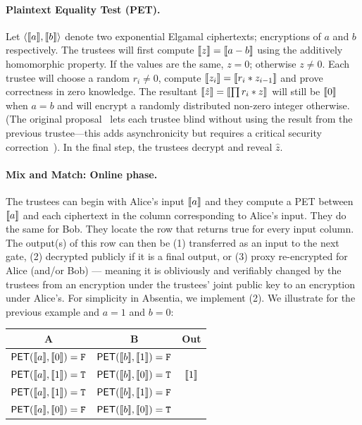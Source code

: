 \paragraph{Plaintext Equality Test (PET).} Let $\left \langle \llbracket a \rrbracket,\llbracket b \rrbracket \right \rangle$ denote two exponential Elgamal ciphertexts; encryptions of $a$ and $b$ respectively. The trustees will first compute $\llbracket z \rrbracket=\llbracket a-b \rrbracket$ using the additively homomorphic property. If the values are the same, $z=0$; otherwise $z\neq 0$. Each trustee will choose a random $r_i\neq0$, compute $\llbracket z_i \rrbracket=\llbracket r_i*z_{i-1} \rrbracket$ and prove correctness in zero knowledge. The resultant $\llbracket \hat{z} \rrbracket=\llbracket \prod r_i*z \rrbracket$ will still be $\llbracket 0 \rrbracket$ when $a=b$ and will encrypt a randomly distributed non-zero integer otherwise. (The original proposal~\cite{JJ00} lets each trustee blind without using the result from the previous trustee---this adds asynchronicity but requires a critical security correction~\cite{mcmurtry2020test}). In the final step, the trustees decrypt and reveal $\hat{z}$.

\paragraph{Mix and Match: Online phase.} The trustees can begin with Alice's input $\llbracket a \rrbracket$ and they compute a PET between $\llbracket a \rrbracket$ and each ciphertext in the column corresponding to Alice's input. They do the same for Bob. They locate the row that returns true for every input column. The output(s) of this row can then be (1) transferred as an input to the next gate, (2) decrypted publicly if it is a final output, or (3) proxy re-encrypted for Alice (and/or Bob) --- meaning it is obliviously and verifiably changed by the trustees from an encryption under the trustees' joint public key to an encryption under Alice's. For simplicity in Absentia, we implement (2). We illustrate for the previous example and $a=1$ and $b=0$:

\begin{center}
\begin{tabular}{|c|c|c|}
  \hline
  A			& 	B			& 	Out   			\\ \hline
  $\mathsf{PET}(\llbracket a \rrbracket,\llbracket 0 \rrbracket) = \mathtt{F}$ 	&	$\mathsf{PET}(\llbracket b \rrbracket,\llbracket 1 \rrbracket) = \mathtt{F}$ 	& 	 		\\ \hline
  $\mathsf{PET}(\llbracket a \rrbracket,\llbracket 1 \rrbracket) = \mathtt{T}$ 	&	$\mathsf{PET}(\llbracket b \rrbracket,\llbracket 0 \rrbracket) = \mathtt{T}$ 	&  $\llbracket 1 \rrbracket$  	\\ \hline
  $\mathsf{PET}(\llbracket a \rrbracket,\llbracket 1 \rrbracket) = \mathtt{T}$ 	&	$\mathsf{PET}(\llbracket b \rrbracket,\llbracket 1 \rrbracket) = \mathtt{F}$ 	&  	 		\\ \hline
  $\mathsf{PET}(\llbracket a \rrbracket,\llbracket 0 \rrbracket) = \mathtt{F}$ 	&	$\mathsf{PET}(\llbracket b \rrbracket,\llbracket 0 \rrbracket) = \mathtt{T}$ 	& 	 		\\ \hline
\end{tabular}
\end{center}

